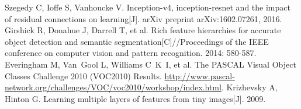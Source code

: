 \begin{thebibliography}{148}
Szegedy C, Ioffe S, Vanhoucke V. Inception-v4, inception-resnet and the impact of residual connections on learning[J]. arXiv preprint arXiv:1602.07261, 2016.
Girshick R, Donahue J, Darrell T, et al. Rich feature hierarchies for accurate object detection and semantic segmentation[C]//Proceedings of the IEEE conference on computer vision and pattern recognition. 2014: 580-587.
Everingham M, Van~Gool L, Williams C~K~I, et al. The {PASCAL} {V}isual {O}bject {C}lasses {C}hallenge 2010 {(VOC2010)}
{R}esults. \url{http://www.pascal-network.org/challenges/VOC/voc2010/workshop/index.html}.
Krizhevsky A, Hinton G. Learning multiple layers of features from tiny images[J]. 2009.
\end{thebibliography}

